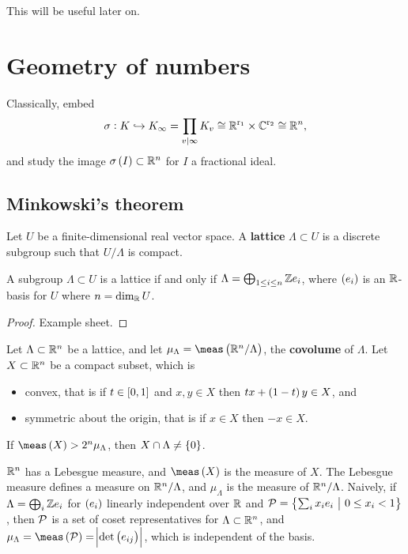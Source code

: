 This will be useful later on.

\pagebreak

\section{Geometry of numbers}

Classically, embed
$$ \sigma : K \hookrightarrow K_\infty = \prod_{v \mid \infty} K_v \cong \mathbb{R}^{\mathrm{r}_1} \times \mathbb{C}^{\mathrm{r}_2} \cong \mathbb{R}^n, $$
and study the image $ \sigma\br{I} \subset \RR^n $ for $ I $ a fractional ideal.

\subsection{Minkowski's theorem}

\begin{definition*}
Let $ U $ be a finite-dimensional real vector space. A \textbf{lattice} $ \Lambda \subset U $ is a discrete subgroup such that $ U / \Lambda $ is compact.
\end{definition*}

\begin{proposition}
A subgroup $ \Lambda \subset U $ is a lattice if and only if $ \Lambda = \bigoplus_{1 \le i \le n} \mathbb{Z} e_i $, where $ \br{e_i} $ is an $ \mathbb{R} $-basis for $ U $ where $ n = \dim_{\mathbb{R}} U $.
\end{proposition}

\begin{proof}
Example sheet.
\end{proof}

\begin{theorem}
\label{thm:7.2}
Let $ \Lambda \subset \mathbb{R}^n $ be a lattice, and let $ \mu_\Lambda = \meas\br{\RR^n / \Lambda} $, the \textbf{covolume} of $ \Lambda $. Let $ X \subset \mathbb{R}^n $ be a compact subset, which is
\begin{itemize}
\item convex, that is if $ t \in \sbr{0, 1} $ and $ x, y \in X $ then $ tx + \br{1 - t}y \in X $, and
\item symmetric about the origin, that is if $ x \in X $ then $ -x \in X $.
\end{itemize}
If $ \meas\br{X} > 2^n\mu_\Lambda $, then $ X \cap \Lambda \ne \cbr{0} $.
\end{theorem}

\begin{remark*}
$ \mathbb{R}^n $ has a Lebesgue measure, and $ \meas\br{X} $ is the measure of $ X $. The Lebesgue measure defines a measure on $ \mathbb{R}^n / \Lambda $, and $ \mu_\Lambda $ is the measure of $ \mathbb{R}^n / \Lambda $. Naively, if $ \Lambda = \bigoplus_i \mathbb{Z} e_i $ for $ \br{e_i} $ linearly independent over $ \mathbb{R} $ and $ \PPP = \cbr{\sum_i x_ie_i \st 0 \le x_i < 1} $, then $ \mathcal{P} $ is a set of coset representatives for $ \Lambda \subset \mathbb{R}^n $, and $ \mu_\Lambda = \meas\br{\PPP} = \abs{\det \br{e_{ij}}} $, which is independent of the basis.
\end{remark*}

